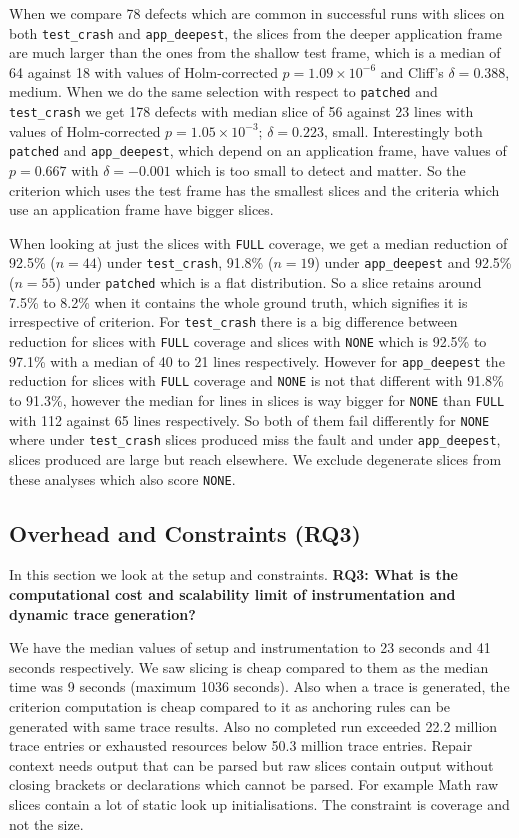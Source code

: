 \documentclass[sigconf,nonacm]{acmart}
\begin{document}
When we compare 78 defects which are common in successful runs with slices on both \texttt{test\_crash} and \texttt{app\_deepest}, the slices from the deeper application frame are much larger than the ones from the shallow test frame, which is a median of 64 against 18 with values of Holm-corrected $p = 1.09 \times 10^{-6}$ and Cliff's $\delta = 0.388$, medium. When we do the same selection with respect to \texttt{patched} and \texttt{test\_crash} we get 178 defects with median slice of 56 against 23 lines with values of Holm-corrected $p = 1.05 \times 10^{-3}$; $\delta = 0.223$, small. Interestingly both \texttt{patched} and \texttt{app\_deepest}, which depend on an application frame, have values of $p = 0.667$ with $\delta = -0.001$ which is too small to detect and matter. So the criterion which uses the test frame has the smallest slices and the criteria which use an application frame have bigger slices.

When looking at just the slices with \texttt{FULL} coverage, we get a median reduction of 92.5\% ($n=44$) under \texttt{test\_crash}, 91.8\% ($n=19$) under \texttt{app\_deepest} and 92.5\% ($n=55$) under \texttt{patched} which is a flat distribution. So a slice retains around 7.5\% to 8.2\% when it contains the whole ground truth, which signifies it is irrespective of criterion. For \texttt{test\_crash} there is a big difference between reduction for slices with \texttt{FULL} coverage and slices with \texttt{NONE} which is 92.5\% to 97.1\% with a median of 40 to 21 lines respectively. However for \texttt{app\_deepest} the reduction for slices with \texttt{FULL} coverage and \texttt{NONE} is not that different with 91.8\% to 91.3\%, however the median for lines in slices is way bigger for \texttt{NONE} than \texttt{FULL} with 112 against 65 lines respectively. So both of them fail differently for \texttt{NONE} where under \texttt{test\_crash} slices produced miss the fault and under \texttt{app\_deepest}, slices produced are large but reach elsewhere. We exclude degenerate slices from these analyses which also score \texttt{NONE}.
\subsection{Overhead and Constraints (RQ3)}
In this section we look at the setup and constraints. \textbf{RQ3: What is the computational cost and scalability limit of instrumentation and dynamic trace generation?}

We have the median values of setup and instrumentation to 23 seconds and 41 seconds respectively. We saw slicing is cheap compared to them as the median time was 9 seconds (maximum 1036 seconds). Also when a trace is generated, the criterion computation is cheap compared to it as anchoring rules can be generated with same trace results. Also no completed run exceeded 22.2 million trace entries or exhausted resources below 50.3 million trace entries.
Repair context needs output that can be parsed but raw slices contain output without closing brackets or declarations which cannot be parsed. For example Math raw slices contain a lot of static look up initialisations. The constraint is coverage and not the size.
\end{document}
